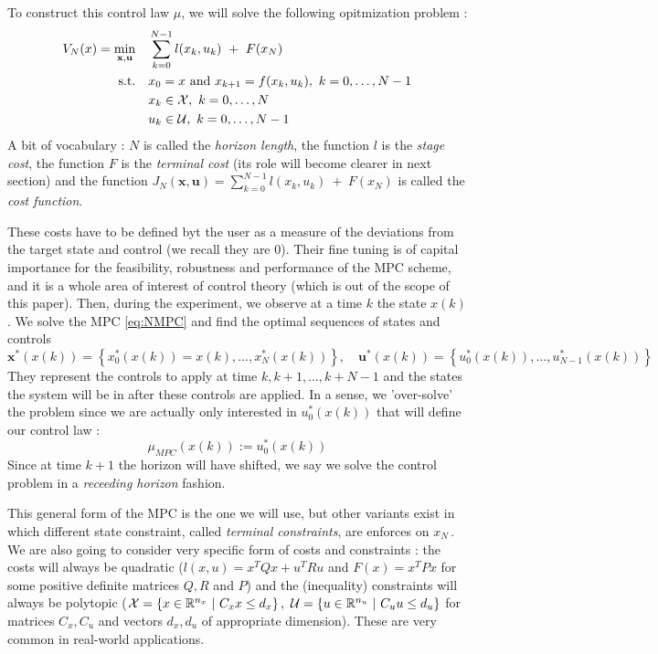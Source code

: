 \documentclass[12pt]{article}
\begin{document}
To construct this control law $\mu$, we will solve the following opitmization problem :
\begin{align}
	\begin{split}
		\label{eq:NMPC}
		V_N(x)=\underset{\mathbf{x},\mathbf{u}}{\min} &\quad \sum_{k=0}^{N-1}l(x_k,u_k)~+~F(x_N)\\
		\text{s.t.} &\quad x_0=x\text{ and }x_{k+1}=f(x_k,u_k),~k=0,\dots,N-1\\
		&\quad x_k\in\cal{X},~k=0,\dots,N\\
		&\quad u_k\in\cal{U},~k=0,\dots,N-1
	\end{split}
\end{align}
A bit of vocabulary : $N$ is called the \textit{horizon length}, the function $l$ is the \textit{stage cost}, the function $F$ is the \textit{terminal cost} (its role will become clearer in next section) and the function $J_N(\mathbf{x},\mathbf{u})=\sum_{k=0}^{N-1}l(x_k,u_k)~+~F(x_N)$ is called the \textit{cost function}.

These costs have to be defined byt the user as a measure of the deviations from the target state and control (we recall they are 0).
Their fine tuning is of capital importance for the feasibility, robustness and performance of the MPC scheme, and it is a whole area of interest of control theory (which is out of the scope of this paper).
Then, during the experiment, we observe at a time $k$ the state $x(k)$.
We solve the MPC \ref{eq:NMPC} and find the optimal sequences of states and controls $$\mathbf{x}^*(x(k))=\left\{ x_0^*(x(k))=x(k),\dots,x_N^*(x(k))\right\},\quad \mathbf{u}^*(x(k))=\left\{ u_0^*(x(k)),\dots,u_{N-1}^*(x(k))\right\}$$
They represent the controls to apply at time $k,k+1,\dots,k+N-1$ and the states the system will be in after these controls are applied.
In a sense, we 'over-solve' the problem since we are actually only interested in $u_0^*(x(k))$ that will define our control law : 
$$\mu_{MPC}(x(k)):=u_0^*(x(k))$$
Since at time $k+1$ the horizon will have shifted, we say we solve the control problem in a \textit{receeding horizon} fashion.

\vspace{12pt}

This general form of the MPC is the one we will use, but other variants exist in which different state constraint, called \textit{terminal constraints}, are enforces on $x_N$\,.
We are also going to consider very specific form of costs and constraints : the costs will always be quadratic ($l(x,u)=x^TQx+u^TRu$ and $F(x)=x^TPx$ for some positive definite matrices $Q,R$ and $P$) and the (inequality) constraints will always be polytopic ($\mathcal{X}=\left\{x\in\mathbb{R}^{n_x}~|~C_xx\leq d_x\right\},~\mathcal{U}=\left\{u\in\mathbb{R}^{n_u}~|~C_uu\leq d_u\right\}$ for matrices $C_x,C_u$ and vectors $d_x,d_u$ of appropriate dimension).
These are very common in real-world applications.
\end{document}

